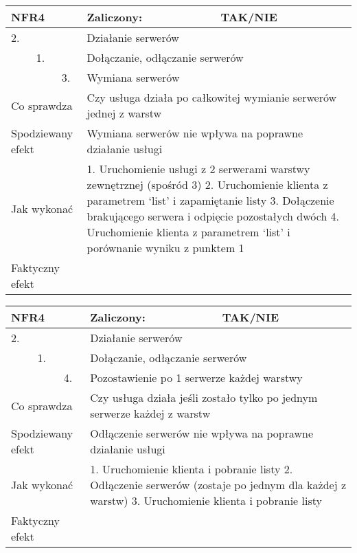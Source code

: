 \begin{tabular}{|p{20pt}|p{20pt}|p{20pt}|p{250pt}|p{60pt}|}
	\hline
	\multicolumn{3}{|p{70pt}|}{NFR4} & Zaliczony: & TAK/NIE \\ \hline
	2. & & & \multicolumn{2}{|p{310pt}|}{Działanie serwerów } \\ \hline
	& 1. & & \multicolumn{2}{|p{310pt}|}{Dołączanie, odłączanie serwerów } \\ \hline
	& & 3. & \multicolumn{2}{|p{310pt}|}{Wymiana serwerów } \\ \hline
	\multicolumn{3}{|p{70pt}|}{Co sprawdza} & \multicolumn{2}{|p{310pt}|}{Czy usługa działa po całkowitej wymianie serwerów jednej z warstw} \\ \hline
	\multicolumn{3}{|p{70pt}|}{Spodziewany efekt} & \multicolumn{2}{|p{310pt}|}{Wymiana serwerów nie wpływa na poprawne działanie usługi} \\ \hline
	\multicolumn{3}{|p{70pt}|}{Jak wykonać} & \multicolumn{2}{|p{310pt}|}{1. Uruchomienie usługi z 2 serwerami warstwy zewnętrznej (spośród 3)
2. Uruchomienie klienta z parametrem ‘list’ i zapamiętanie listy
3. Dołączenie brakującego serwera i odpięcie pozostałych dwóch
4. Uruchomienie klienta z parametrem ‘list’ i porównanie wyniku z punktem 1} \\ \hline
	\multicolumn{3}{|p{70pt}|}{Faktyczny efekt} & \multicolumn{2}{|p{310pt}|}{} \\ \hline
\end{tabular}

\begin{tabular}{|p{20pt}|p{20pt}|p{20pt}|p{250pt}|p{60pt}|}
	\hline
	\multicolumn{3}{|p{70pt}|}{NFR4} & Zaliczony: & TAK/NIE \\ \hline
	2. & & & \multicolumn{2}{|p{310pt}|}{Działanie serwerów } \\ \hline
	& 1. & & \multicolumn{2}{|p{310pt}|}{Dołączanie, odłączanie serwerów } \\ \hline
	& & 4. & \multicolumn{2}{|p{310pt}|}{Pozostawienie po 1 serwerze każdej warstwy } \\ \hline
	\multicolumn{3}{|p{70pt}|}{Co sprawdza} & \multicolumn{2}{|p{310pt}|}{Czy usługa działa jeśli zostało tylko po jednym serwerze każdej z warstw} \\ \hline
	\multicolumn{3}{|p{70pt}|}{Spodziewany efekt} & \multicolumn{2}{|p{310pt}|}{Odłączenie serwerów nie wpływa na poprawne działanie usługi} \\ \hline
	\multicolumn{3}{|p{70pt}|}{Jak wykonać} & \multicolumn{2}{|p{310pt}|}{1. Uruchomienie klienta i pobranie listy
2. Odłączenie serwerów (zostaje po jednym dla każdej z warstw)
3. Uruchomienie klienta i pobranie listy} \\ \hline
	\multicolumn{3}{|p{70pt}|}{Faktyczny efekt} & \multicolumn{2}{|p{310pt}|}{} \\ \hline
\end{tabular}

